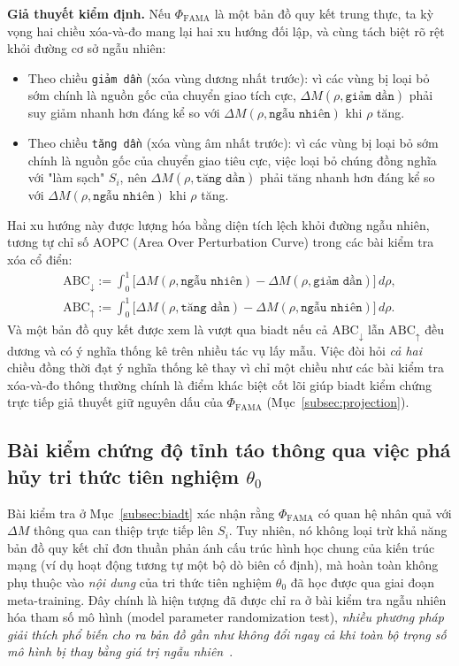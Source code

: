 \textbf{Giả thuyết kiểm định.} Nếu $\Phi_{\text{FAMA}}$ là một bản đồ quy kết trung thực, ta kỳ vọng hai chiều xóa-và-đo mang lại hai xu hướng đối lập, và cùng tách biệt rõ rệt khỏi đường cơ sở ngẫu nhiên:
\begin{itemize}
    \item Theo chiều \texttt{giảm dần} (xóa vùng dương nhất trước): vì các vùng bị loại bỏ sớm chính là nguồn gốc của chuyển giao tích cực, $\Delta M(\rho,\allowbreak\texttt{giảm dần})$ phải suy giảm nhanh hơn đáng kể so với $\Delta M(\rho,\allowbreak\texttt{ngẫu nhiên})$ khi $\rho$ tăng.
    \item Theo chiều \texttt{tăng dần} (xóa vùng âm nhất trước): vì các vùng bị loại bỏ sớm chính là nguồn gốc của chuyển giao tiêu cực, việc loại bỏ chúng đồng nghĩa với "làm sạch" $S_i$, nên $\Delta M(\rho,\allowbreak\texttt{tăng dần})$ phải tăng nhanh hơn đáng kể so với $\Delta M(\rho,\allowbreak\texttt{ngẫu nhiên})$ khi $\rho$ tăng.
\end{itemize}
Hai xu hướng này được lượng hóa bằng diện tích lệch khỏi đường ngẫu nhiên, tương tự chỉ số AOPC (Area Over Perturbation Curve) trong các bài kiểm tra xóa cổ điển:
\begin{equation}
    \begin{split}
    \mathrm{ABC}_{\downarrow} := \int_0^1 \Big[\Delta M(\rho,\texttt{ngẫu nhiên}) - \Delta M(\rho,\texttt{giảm dần})\Big]\,d\rho, \\
    \mathrm{ABC}_{\uparrow} := \int_0^1 \Big[\Delta M(\rho,\texttt{tăng dần}) - \Delta M(\rho,\texttt{ngẫu nhiên})\Big]\,d\rho.
    \end{split}
    \label{eq:abc_metric}
\end{equation}
Và một bản đồ quy kết được xem là vượt qua \acrshort{biadt} nếu cả $\mathrm{ABC}_{\downarrow}$ lẫn $\mathrm{ABC}_{\uparrow}$ đều dương và có ý nghĩa thống kê trên nhiều tác vụ lấy mẫu. Việc đòi hỏi \emph{cả hai} chiều đồng thời đạt ý nghĩa thống kê thay vì chỉ một chiều như các bài kiểm tra xóa-và-đo thông thường chính là điểm khác biệt cốt lõi giúp \acrshort{biadt} kiểm chứng trực tiếp giả thuyết giữ nguyên dấu của $\Phi_{\text{FAMA}}$ (Mục~\ref{subsec:projection}).
 
\subsection{Bài kiểm chứng độ tỉnh táo thông qua việc phá hủy tri thức tiên nghiệm $\theta_0$}
\label{subsec:sanity_theta0}
 
Bài kiểm tra ở Mục~\ref{subsec:biadt} xác nhận rằng $\Phi_{\text{FAMA}}$ có quan hệ nhân quả với $\Delta M$ thông qua can thiệp trực tiếp lên $S_i$. Tuy nhiên, nó không loại trừ khả năng bản đồ quy kết chỉ đơn thuần phản ánh cấu trúc hình học chung của kiến trúc mạng (ví dụ hoạt động tương tự một bộ dò biên cố định), mà hoàn toàn không phụ thuộc vào \emph{nội dung} của tri thức tiên nghiệm $\theta_0$ đã học được qua giai đoạn meta-training. Đây chính là hiện tượng đã được chỉ ra ở bài kiểm tra ngẫu nhiên hóa tham số mô hình (model parameter randomization test), \textit{nhiều phương pháp giải thích phổ biến cho ra bản đồ gần như không đổi ngay cả khi toàn bộ trọng số mô hình bị thay bằng giá trị ngẫu nhiên}~\cite{adebayo2018sanity}.
 
